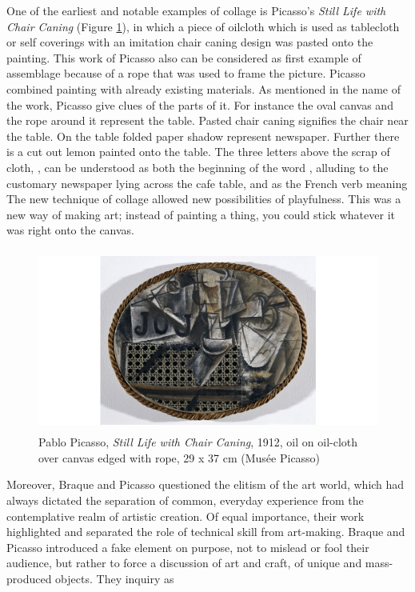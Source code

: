 One of the earliest and notable examples of collage is Picasso’s \textit{Still Life with Chair Caning} (Figure \ref{fig:Picasso_Chair}), in which a piece of oilcloth which is used as tablecloth or self coverings with an imitation chair caning design was pasted onto the painting. This work of Picasso also can be considered as first example of assemblage because of a rope that was used to frame the picture. Picasso combined painting with already existing materials. As mentioned in the name of the work, Picasso give clues of the parts of it. For instance the oval canvas and the rope around it represent the table. Pasted chair caning signifies the chair near the table. On the table folded paper shadow represent newspaper. Further there is a cut out lemon painted onto the table. The three letters above the scrap of cloth, , can be understood as both the beginning of the word , alluding to the customary newspaper lying across the cafe table, and as the French verb meaning  The new technique of collage allowed new possibilities of playfulness. This was a new way of making art; instead of painting a thing, you could stick whatever it was right onto the canvas.

\begin{figure}[h!]
  \centering
  \includegraphics[height=6cm]{graphics/picasso_chair.png}
  \caption{Pablo Picasso, \textit{Still Life with Chair Caning}, 1912, oil on oil-cloth over canvas edged with rope, 29 x 37 cm (Musée Picasso)}
  \label{fig:Picasso_Chair}
\end{figure}

Moreover, Braque and Picasso questioned the elitism of the art world, which had always dictated the separation of common, everyday experience from the contemplative realm of artistic creation. Of equal importance, their work highlighted and separated the role of technical skill from art-making. Braque and Picasso introduced a fake element on purpose, not to mislead or fool their audience, but rather to force a discussion of art and craft, of unique and mass-produced objects. They inquiry as 


